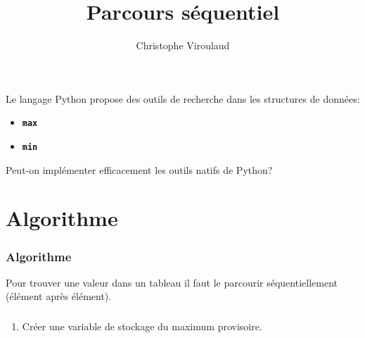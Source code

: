 \documentclass[svgnames,11pt]{beamer}
\author[]{Christophe Viroulaud}
\title{Parcours séquentiel}
\date{\framebox{\textbf{Algo 01}}}
\institute{Première - NSI}
\begin{document}
\begin{frame}
    \titlepage
\end{frame}
\begin{frame}
    \frametitle{}
    Le langage Python propose des outils de recherche dans les structures de données:
    \begin{itemize}
        \item \textbf{\texttt{max}}
        \item \textbf{\texttt{min}}
    \end{itemize}
    \begin{framed}
        \centering Peut-on implémenter efficacement les outils natifs de Python?
    \end{framed}

\end{frame}
\section{Algorithme}
\begin{frame}
    \frametitle{Algorithme}

    \begin{center}
    \end{center}
    \begin{aretenir}[]
        Pour trouver une valeur dans un tableau il faut le parcourir séquentiellement (élément après élément).
    \end{aretenir}
\end{frame}
\begin{frame}
    \frametitle{}

    \begin{center}
    \end{center}
    \begin{enumerate}
        \item Créer une variable de stockage du maximum provisoire.
    \end{enumerate}
\end{frame}
\end{document}
